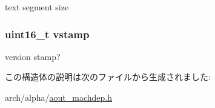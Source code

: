 text segment size \hypertarget{structaout__exechdr_a13649f90a560cfdf9c2ec241beaa866c}{
\subsubsection[{vstamp}]{\setlength{\rightskip}{0pt plus 5cm}uint16\_\-t {\bf vstamp}}}
\label{structaout__exechdr_a13649f90a560cfdf9c2ec241beaa866c}


version stamp? 

この構造体の説明は次のファイルから生成されました:\begin{DoxyCompactItemize}
\item 
arch/alpha/\hyperlink{aout__machdep_8h}{aout\_\-machdep.h}\end{DoxyCompactItemize}
